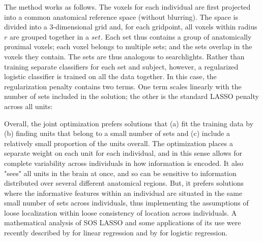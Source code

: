 The method works as follows. The voxels for each individual are first projected into a common anatomical reference space (without blurring). The space is divided into a 3-dimensional grid and, for each gridpoint, all voxels within radius $r$ are grouped together in a $set$. Each set thus contains a group of anatomically proximal voxels; each voxel belongs to multiple sets; and the sets overlap in the voxels they contain. The sets are thus analogous to searchlights. Rather than training separate classifiers for each set and subject, however, a regularized logistic classifier is trained on all the data together. In this case, the regularization penalty contains two terms. One term scales linearly with the number of sets included in the solution; the other is the standard LASSO penalty across all units:


Overall, the joint optimization prefers solutions that (a) fit the training data by (b) finding units that belong to a small number of sets and (c) include a relatively small proportion of the units overall. The optimization places a separate weight on each unit for each individual, and in this sense allows for complete variability across individuals in how information is encoded. It also "sees" all units in the brain at once, and so can be sensitive to information distributed over several different anatomical regions. But, it prefers solutions where the informative features within an individual are situated in the same small number of sets across individuals, thus implementing the assumptions of loose localization within loose consistency of location across individuals. A mathematical analysis of SOS LASSO and some applications of its use were recently described by \cite{RaoNIPS} for linear regression and by \cite{RaoML} for logistic regression. 

